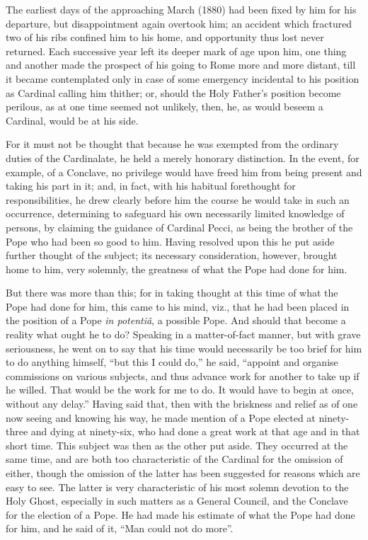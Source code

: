 The earliest days of the approaching March (1880) had been fixed by
him for his departure, but disappointment again overtook him; an
accident which fractured two of his ribs confined him to his home, and
opportunity thus lost never returned. Each successive year left its
deeper mark of age upon him, one thing and another made the prospect
of his going to Rome more and more distant, till it became
contemplated only in case of some emergency incidental to his position
as Cardinal calling him thither; or, should the Holy Father's position
become perilous, as at one time seemed not unlikely, then, he, as
would beseem a Cardinal, would be at his side.

For it must not be thought that because he was exempted from the
ordinary duties of the Cardinalate, he held a merely honorary
distinction. In the event, for example, of a Conclave, no privilege
would have freed him from being present and taking his part in it;
and, in fact, with his habitual forethought for responsibilities, he
drew clearly before him the course he would take in such an
occurrence, determining to safeguard his own necessarily limited
knowledge of persons, by claiming the guidance of Cardinal Pecci, as
being the brother of the Pope who had been so good to him. Having
resolved upon this he put aside further thought of the subject; its
necessary consideration, however, brought home to him, very solemnly,
the greatness of what the Pope had done for him.

But there was more than this; for in taking thought at this time of
what the Pope had done for him, this came to his mind, viz., that he
had been placed in the position of a Pope \emph{in potentiâ}, a
possible Pope. And should that become a reality what ought he to do?
Speaking in a matter-of-fact manner, but with grave seriousness, he
went on to say that his time would necessarily be too brief for him to
do anything himself, ``but this I could do,'' he said,
``appoint and organise commissions on various subjects, and thus
advance work for another to take up if he willed. That would be the
work for me to do. It would have to begin at once, without any
delay.'' Having said that, then with the briskness and
relief as of one now seeing and knowing his way, he made mention of a
Pope elected at ninety-three and dying at ninety-six, who had done a
great work at that age and in that short time. This subject was then
as the other put aside. They occurred at the same time, and are both
too characteristic of the Cardinal for the omission of either, though
the omission of the latter has been suggested for reasons which are
easy to see. The latter is very characteristic of his most solemn
devotion to the Holy Ghost, especially in such matters as a General
Council, and the Conclave for the election of a Pope. He had made his
estimate of what the Pope had done for him, and he said of it,
``Man could not do more''.

